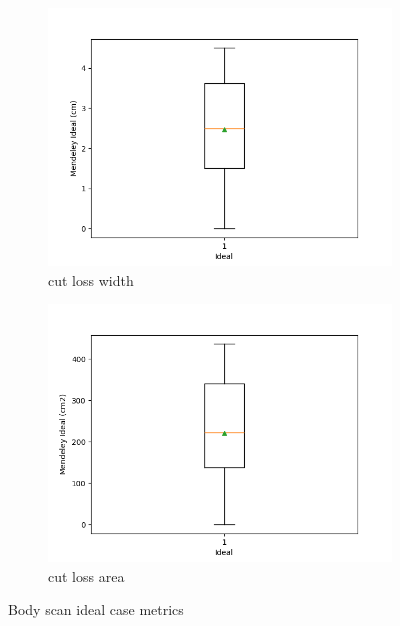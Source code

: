 \begin{figure}[H]
\begin{subfigure}[b]{0.45\textwidth}
        \centering
        \includegraphics[width=\textwidth]{Images/Mendeley_cut_loss_width_ideal_Boxplot.png}
        \caption{cut loss width}
        \label{fig:body_scan_cut_loss_width}
    \end{subfigure}
    \hfill
    \begin{subfigure}[b]{0.45\textwidth}
        \centering
        \includegraphics[width=\textwidth]{Images/Mendeley_cut_loss_area_ideal_Boxplot.png}
        \caption{cut loss area}
        \label{fig:body_scan_cut_loss_area}
    \end{subfigure}
    \vfill
    \caption{Body scan ideal case metrics}
\end{figure}


